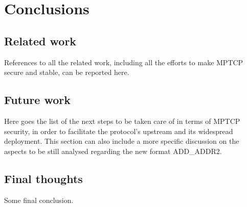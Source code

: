 \chapter{Conclusions}
\label{chap:conclusions}

\section{Related work}
References to all the related work, including all the efforts to make MPTCP secure and stable, can be reported here.

\section{Future work}
Here goes the list of the next steps to be taken care of in terms of MPTCP security, in order to facilitate the protocol's upstream and its widespread deployment. This section can also include a more specific discussion on the aspects to be still analysed regarding the new format ADD\_ADDR2.

\section{Final thoughts}
Some final conclusion.